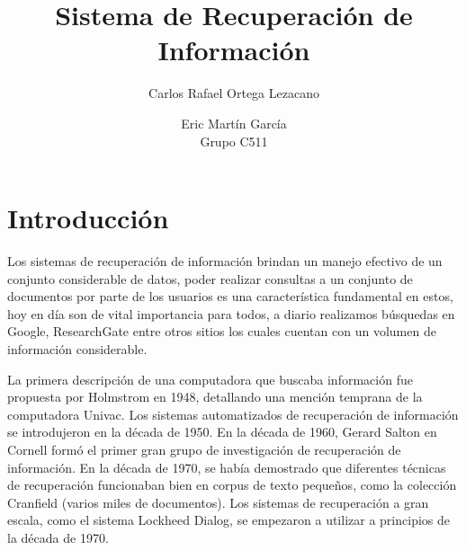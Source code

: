 \documentclass[runningheads,a4paper]{llncs}
\begin{document}
\mainmatter  %

\title{Sistema de Recuperación de Información}


%
%
\author{Carlos Rafael Ortega Lezacano \and Eric Martín García \\ Grupo C511}
%


%
%

\maketitle

\section{Introducción}

Los sistemas de recuperación de información brindan un manejo efectivo de un conjunto considerable de datos, poder realizar consultas a un conjunto de documentos por parte de los usuarios es una característica fundamental en estos, hoy en día son de vital importancia para todos, a diario realizamos búsquedas en Google, ResearchGate entre otros sitios los cuales cuentan con un volumen de información considerable. 

La primera descripción de una computadora que buscaba información fue propuesta por Holmstrom en 1948, detallando una mención temprana de la computadora Univac. Los sistemas automatizados de recuperación de información se introdujeron en la década de 1950. En la década de 1960, Gerard Salton en Cornell formó el primer gran grupo de investigación de recuperación de información. En la década de 1970, se había demostrado que diferentes técnicas de recuperación funcionaban bien en corpus de texto pequeños, como la colección Cranfield (varios miles de documentos). Los sistemas de recuperación a gran escala, como el sistema Lockheed Dialog, se empezaron a utilizar a principios de la década de 1970. 
\end{document}
